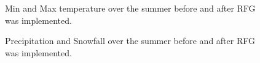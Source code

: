 \documentclass{article}
\begin{document}
\begin{figure}[h]

\caption{\label{fig:control_doyA3}Min and Max temperature over the summer before and after RFG was implemented.}
\end{figure}

\begin{figure}[h]

\caption{\label{fig:control_doyB3}Precipitation and Snowfall over the summer before and after RFG was implemented.}
\end{figure}
\end{document}
